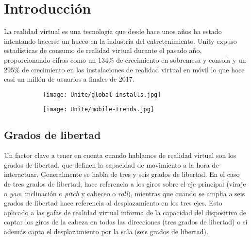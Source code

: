 








\pagestyle{empty}
\chapter{Introducción}
La realidad virtual es una tecnología que desde hace unos años ha estado intentando hacerse un hueco en la industria del entretenimiento. Unity expuso estadísticas de consumo de realidad virtual durante el pasado año, proporcionando cifras como un 134\% de crecimiento en sobremesa y consola y un 295\% de crecimiento en las instalaciones de realidad virtual en móvil lo que hace casi un millón de usuarios a finales de 2017.

\begin{figure}[h]
\centering
\begin{subfigure}{.5\linewidth}
	\centering
	\texttt{[image: Unite/global-installs.jpg]}
\end{subfigure}%
\begin{subfigure}{.5\linewidth}
	\centering
	\texttt{[image: Unite/mobile-trends.jpg]}
\end{subfigure}
\end{figure}


\section{Grados de libertad}
Un factor clave a tener en cuenta cuando hablamos de realidad virtual son los grados de libertad, que definen la capacidad de movimiento a la hora de interactuar. Generalmente se habla de tres y seis grados de libertad. En el caso de tres grados de libertad, hace referencia a los giros sobre el eje principal (viraje o \textit{yaw}, inclinación o \textit{pitch} y cabeceo o \textit{roll}), mientras que cuando se amplia a seis grados de libertad hace referencia al desplazamiento en los tres ejes. Esto aplicado a las gafas de realidad virtual informa de la capacidad del dispositivo de captar los giros de la cabeza en todas las direcciones (tres grados de libertad) o si además capta el desplazamiento por la sala (seis grados de libertad).

